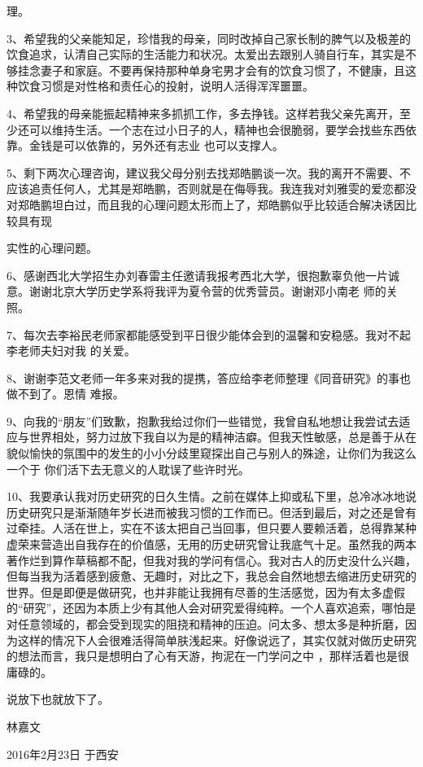 \documentclass{article}
\begin{document}
\newpage
理。 

3、希望我的父亲能知足，珍惜我的母亲，同时改掉自己家长制的脾气以及极差的饮食追求，认清自己实际的生活能力和状况。太爱出去跟别人骑自行车，其实是不够挂念妻子和家庭。不要再保持那种单身宅男才会有的饮食习惯了，不健康，且这种饮食习惯是对性格和责任心的投射，说明人活得浑浑噩噩。
 

4、希望我的母亲能振起精神来多抓抓工作，多去挣钱。这样若我父亲先离开，至少还可以维持生活。一个志在过小日子的人，精神也会很脆弱，要学会找些东西依靠。金钱是可以依靠的，另外还有志业
也可以支撑人。 

5、剩下两次心理咨询，建议我父母分别去找郑皓鹏谈一次。我的离开不需要、不应该追责任何人，尤其是郑皓鹏，否则就是在侮辱我。我连我对刘雅雯的爱恋都没对郑皓鹏坦白过，而且我的心理问题太形而上了，郑皓鹏似乎比较适合解决诱因比较具有现

\newpage
实性的心理问题。 

6、感谢西北大学招生办刘春雷主任邀请我报考西北大学，很抱歉辜负他一片诚意。谢谢北京大学历史学系将我评为夏令营的优秀营员。谢谢邓小南老
师的关照。 

7、每次去李裕民老师家都能感受到平日很少能体会到的温馨和安稳感。我对不起李老师夫妇对我
的关爱。 

8、谢谢李范文老师一年多来对我的提携，答应给李老师整理《同音研究》的事也做不到了。恩情
难报。 

9、向我的“朋友”们致歉，抱歉我给过你们一些错觉，我曾自私地想让我尝试去适应与世界相处，努力过放下我自以为是的精神洁癖。但我天性敏感，总是善于从在貌似愉快的氛围中的发生的小小分歧里窥探出自己与别人的殊途，让你们为我这么一个于
你们活下去无意义的人耽误了些许时光。 

\newpage

10、我要承认我对历史研究的日久生情。之前在媒体上抑或私下里，总冷冰冰地说历史研究只是渐渐随年岁长进而被我习惯的工作而已。但活到最后，对之还是曾有过牵挂。人活在世上，实在不该太把自己当回事，但只要人要赖活着，总得靠某种虚荣来营造出自我存在的价值感，无用的历史研究曾让我底气十足。虽然我的两本著作烂到算作草稿都不配，但我对我的学问有信心。我对古人的历史没什么兴趣，但每当我为活着感到疲惫、无趣时，对比之下，我总会自然地想去缩进历史研究的世界。但是即便是做研究，也并非能让我拥有尽善的生活感觉，因为有太多虚假的“研究”，还因为本质上少有其他人会对研究爱得纯粹。一个人喜欢追索，哪怕是对任意领域的，都会受到现实的阻挠和精神的压迫。问太多、想太多是种折磨，因为这样的情况下人会很难活得简单肤浅起来。好像说远了，其实仅就对做历史研究的想法而言，我只是想明白了心有天游，拘泥在一门学问之中
，那样活着也是很庸碌的。 


说放下也就放下了。 

\newpage


林嘉文 

2016年2月23日 于西安
\end{document}
